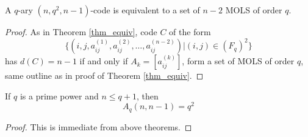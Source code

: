 \documentclass[../main.tex]{subfiles}
\begin{document}
\begin{thm}
	A $q$-ary $(n,q^2,n-1)$-code is equivalent to a set of $n-2$ MOLS of order $q$.
\end{thm}

\begin{proof}
	As in Theorem \ref{thm_equiv}, code $C$ of the form 
	\[
		\{ (i, j, a_{ij}^{(1)}, a_{ij}^{(2)}, \ldots, a_{ij}^{(n-2)}) | (i,j)\in (F_q)^2 \}	
	\]
	has $d(C)=n-1$ if and only if $A_k = [a_{ij}^{(k)}]$, form a set of MOLS of order $q$, same outline as in proof of Theorem \ref{thm_equiv}.
\end{proof}

\begin{cor}
	If $q$ is a prime power and $n\leq q+1$, then 
	\[
		A_q(n,n-1) = q^2
	\]
\end{cor}

\begin{proof}
	This is immediate from above theorems.
\end{proof}
\end{document}
